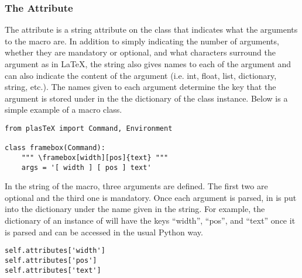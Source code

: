 \subsubsection{The  Attribute}

The  attribute is a string attribute on the class 
that indicates what the arguments to the macro are.  In addition to
simply indicating the number of arguments, whether they are mandatory
or optional, and what characters surround the argument as in \LaTeX,
the  string also gives names to each of the argument
and can also indicate the content of the argument (i.e. int, float,
list, dictionary, string, etc.).  The names given to each argument
determine the key that the argument is stored under in the the
 dictionary of the class instance.  Below is a simple
example of a macro class.
\begin{verbatim}
from plasTeX import Command, Environment

class framebox(Command):
    """ \framebox[width][pos]{text} """
    args = '[ width ] [ pos ] text'
\end{verbatim}

In the  string of the  macro, three arguments
are defined.  The first two are optional and the third one is mandatory.
Once each argument is parsed, in is put into the 
dictionary under the name given in the  string.  For example,
the  dictionary of an instance of 
will have the keys ``width'', ``pos'', and ``text'' once it is parsed
and can be accessed in the usual Python way.
\begin{verbatim}
self.attributes['width']
self.attributes['pos']
self.attributes['text']
\end{verbatim}


